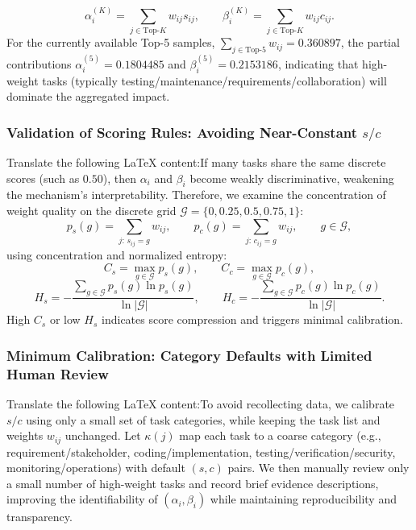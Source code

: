 \begin{equation}
    \alpha_i^{(K)}=\sum_{j\in \text{Top-}K} w_{ij}s_{ij},\qquad
    \beta_i^{(K)}=\sum_{j\in \text{Top-}K} w_{ij}c_{ij}.
\end{equation}
For the currently available Top-5 samples, $\sum_{j\in \text{Top-}5} w_{ij}=0.360897$,
the partial contributions $\alpha_i^{(5)}=0.1804485$ and $\beta_i^{(5)}=0.2153186$,
indicating that high-weight tasks (typically testing/maintenance/requirements/collaboration) will dominate the aggregated impact.\subsubsection{Validation of Scoring Rules: Avoiding Near-Constant $s/c$}Translate the following LaTeX content:If many tasks share the same discrete scores (such as $0.50$), then $\alpha_i$ and $\beta_i$ become weakly discriminative, weakening the mechanism's interpretability.  
Therefore, we examine the concentration of weight quality on the discrete grid $\mathcal{G}=\{0,0.25,0.5,0.75,1\}$:  
\begin{equation}
    p_s(g)=\sum_{j:\,s_{ij}=g} w_{ij},\qquad
    p_c(g)=\sum_{j:\,c_{ij}=g} w_{ij},\qquad g\in\mathcal{G},
\end{equation}
using concentration and normalized entropy:  
\begin{equation}
    C_s=\max_{g\in\mathcal{G}} p_s(g),\qquad
    C_c=\max_{g\in\mathcal{G}} p_c(g),
\end{equation}
\begin{equation}
    H_s=-\frac{\sum_{g\in\mathcal{G}} p_s(g)\ln p_s(g)}{\ln|\mathcal{G}|},\qquad
    H_c=-\frac{\sum_{g\in\mathcal{G}} p_c(g)\ln p_c(g)}{\ln|\mathcal{G}|}.
\end{equation}
High $C_s$ or low $H_s$ indicates score compression and triggers minimal calibration.\subsubsection{Minimum Calibration: Category Defaults with Limited Human Review}Translate the following LaTeX content:To avoid recollecting data, we calibrate $s/c$ using only a small set of task categories, while keeping the task list and weights $w_{ij}$ unchanged.
Let $\kappa(j)$ map each task to a coarse category (e.g., requirement/stakeholder, coding/implementation, testing/verification/security, monitoring/operations) with default $(s,c)$ pairs.
We then manually review only a small number of high-weight tasks and record brief evidence descriptions, improving the identifiability of $(\alpha_i,\beta_i)$ while maintaining reproducibility and transparency.
